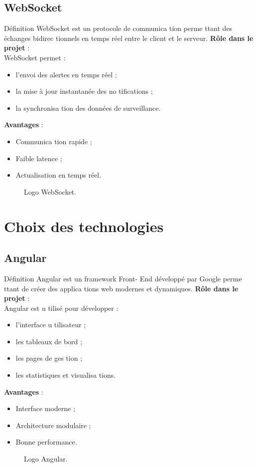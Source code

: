 \documentclass[12pt,a4paper]{report}
\numberwithin{figure}{chapter}
\numberwithin{table}{chapter}
\begin{document}
\subsection{WebSocket}
Déﬁnition
WebSocket est un protocole de communica tion perme ttant des échanges bidirec tionnels en temps
réel entre le client et le serveur.
\textbf{Rôle dans le projet} : \\
WebSocket permet :
\begin{itemize}
  \item l’envoi des alertes en temps réel ;
  \item la mise à jour instantanée des no tiﬁcations ;
  \item la synchronisa tion des données de surveillance.
\end{itemize}
\textbf{Avantages} : \\
\begin{itemize}
  \item Communica tion rapide ;
  \item Faible latence ;
  \item Actualisation en temps réel.
\end{itemize}
\begin{figure}[H]
  \centering
  \caption{Logo WebSocket.}
\end{figure}
\section{Choix des technologies}
\subsection{Angular}
Déﬁnition
Angular est un framework Front- End développé par Google perme ttant de créer des applica tions web
modernes et dynamiques.
\textbf{Rôle dans le projet} : \\
Angular est u tilisé pour développer :
\begin{itemize}
  \item l’interface u tilisateur ;
  \item les tableaux de bord ;
  \item les pages de ges tion ;
  \item les statistiques et visualisa tions.
\end{itemize}
\textbf{Avantages} : \\
\begin{itemize}
  \item Interface moderne ;
  \item Architecture modulaire ;
  \item Bonne performance.
\end{itemize}
\begin{figure}[H]
  \centering
  \caption{Logo Angular.}
\end{figure}
\end{document}
